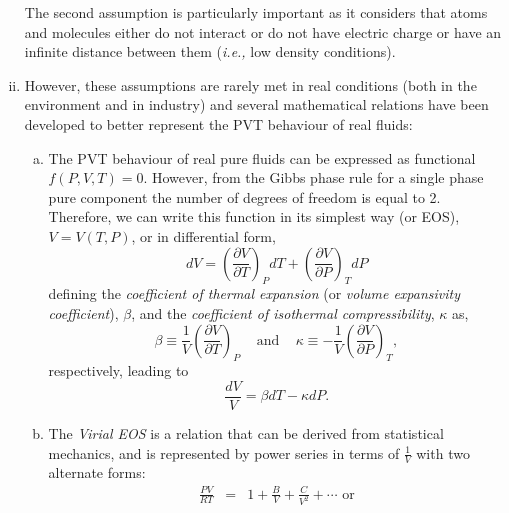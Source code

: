 \documentclass[12pts,a4paper,amsmath,amssymb,floatfix]{article}%
\newcommand{\frc}{\displaystyle\frac}
\newcommand{\ie}{{\it i.e., }}
\begin{document}
\begin{enumerate}[i)]
\begin{enumerate}[(a)]
            \end{enumerate}
            The second assumption is particularly important as it considers that atoms and molecules either do not interact or do not have electric charge or have an infinite distance between them (\ie low density conditions).
%
        \item However, these assumptions are rarely met in real conditions (both in the environment and in industry) and several mathematical relations have been developed to better represent the PVT behaviour of real fluids:
            \begin{enumerate}[a)]
%
                \item The PVT behaviour of real pure fluids can be expressed as functional $f(P,V,T) = 0$. However, from the Gibbs phase rule for a single phase pure component the number of degrees of freedom is equal to 2. Therefore, we can write this function in its simplest way (or EOS), $V=V(T,P)$, or in differential form,
                   \begin{displaymath}
                      dV = \left(\frc{\partial V}{\partial T}\right)_{P}dT + \left(\frc{\partial V}{\partial P}\right)_{T}dP
                   \end{displaymath}
                   defining the {\it coefficient of thermal expansion} (or {\it volume expansivity coefficient}), $\beta$, and the {\it coefficient of isothermal compressibility}, $\kappa$ as,
                   \begin{equation}
                      \beta \equiv \frc{1}{V}\left(\frc{\partial V}{\partial T}\right)_{P}\;\;\;\text{ and }\;\;\;\kappa \equiv -\frc{1}{V}\left(\frc{\partial V}{\partial P}\right)_{T},\label{Mod02_Compressibilityexpansivity}
                   \end{equation}
                   respectively, leading to
                   \begin{equation}
                       \frc{dV}{V} = \beta dT - \kappa dP.\label{Mod02_Compressibilityexpansivity2}
                   \end{equation}
%
                \item The {\it Virial EOS} is a relation that can be derived from statistical mechanics, and is represented by power series in terms of $\frac{1}{V}$ with two alternate forms:
                   \begin{eqnarray}
                       \frc{P V}{R T} &=& 1 + \frc{B}{V} + \frc{C}{V^{2}} + \cdots \text{ or} \label{Mod02_Virial1}\\

\end{eqnarray}
\end{enumerate}
\end{enumerate}
\end{document}
